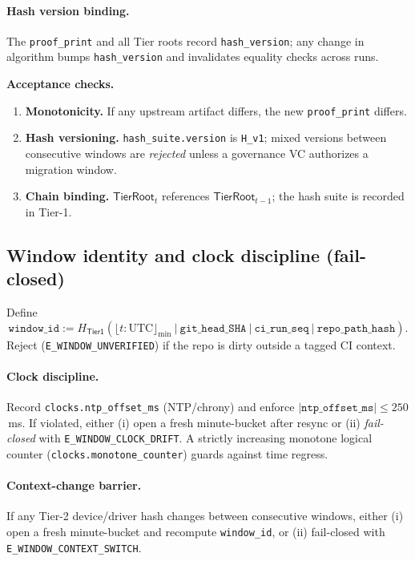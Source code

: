 \documentclass[10pt]{article}
\newenvironment{acceptchecks}{\par\medskip\noindent\textbf{Acceptance checks.}\begin{enumerate}[leftmargin=*]}{\end{enumerate}\medskip}
\newenvironment{acceptchecks}{\begin{mdframed}\textbf{Acceptance checks.}\begin{enumerate}[leftmargin=*]}{\end{enumerate}\end{mdframed}}
\begin{document}
\paragraph{Hash version binding.}
The \texttt{proof\_print} and all Tier roots record \texttt{hash\_version}; any change in algorithm bumps \texttt{hash\_version} and invalidates equality checks across runs.

\begin{acceptchecks}
  \item \textbf{Monotonicity.} If any upstream artifact differs, the new \texttt{proof\_print} differs.
  \item \textbf{Hash versioning.} \texttt{hash\_suite.version} is \texttt{H\_v1}; mixed versions between consecutive windows are \emph{rejected} unless a governance VC authorizes a migration window.
  \item \textbf{Chain binding.} $\mathsf{TierRoot}_t$ references $\mathsf{TierRoot}_{t-1}$; the hash suite is recorded in Tier-1.
\end{acceptchecks}

\subsection*{Window identity and clock discipline (fail-closed)}
Define
\[
\texttt{window\_id} := H_{\mathsf{Tier1}}\!\left(\lfloor t\!:\!\mathrm{UTC}\rfloor_{\mathrm{min}}\ \big|\ \texttt{git\_head\_SHA}\ \big|\ \texttt{ci\_run\_seq}\ \big|\ \texttt{repo\_path\_hash}\right).
\]
Reject (\texttt{E\_WINDOW\_UNVERIFIED}) if the repo is dirty outside a tagged CI context.

\paragraph{Clock discipline.}
Record \texttt{clocks.ntp\_offset\_ms} (NTP/chrony) and enforce $|\texttt{ntp\_offset\_ms}|\le 250$\,ms.
If violated, either (i) open a fresh minute-bucket after resync or (ii) \emph{fail-closed} with \texttt{E\_WINDOW\_CLOCK\_DRIFT}.
A strictly increasing monotone logical counter (\texttt{clocks.monotone\_counter}) guards against time regress.

\paragraph{Context-change barrier.}
If any Tier-2 device/driver hash changes between consecutive windows, either (i) open a fresh minute-bucket and recompute \texttt{window\_id}, or (ii) fail-closed with \texttt{E\_WINDOW\_CONTEXT\_SWITCH}.
\end{document}
